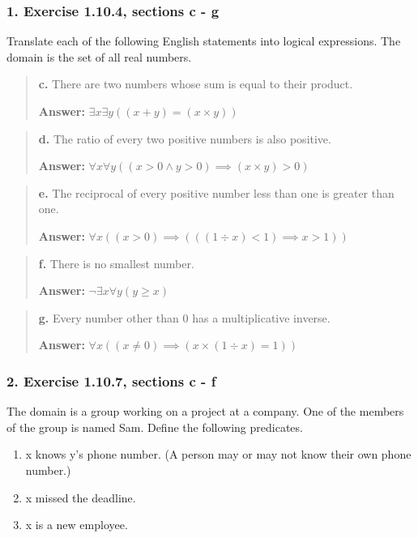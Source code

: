 \documentclass[11pt, oneside]{article}
\begin{document}
\subsubsection*{1. Exercise 1.10.4, sections c - g}

Translate each of the following English statements into logical expressions. The domain is the set of all real numbers.

\begin{quote}
    \textbf{c. }There are two numbers whose sum is equal to their product.

    \textbf{Answer:} $\exists x \exists y ((x + y) = (x \times y))$
\end{quote}

\begin{quote}
    \textbf{d. }The ratio of every two positive numbers is also positive.

    \textbf{Answer:} $\forall x \forall y ((x > 0 \land y > 0) \implies (x \times y) > 0)$
\end{quote}

\begin{quote}
    \textbf{e. }The reciprocal of every positive number less than one is greater than one.

    \textbf{Answer:} $\forall x ((x > 0) \implies (((1 \div x) < 1) \implies x > 1))$
\end{quote}

\begin{quote}
    \textbf{f. }There is no smallest number.

    \textbf{Answer:} $\neg \exists x \forall y (y \geqslant x)$
\end{quote}

\begin{quote}
    \textbf{g. }Every number other than 0 has a multiplicative inverse.

    \textbf{Answer:} $\forall x ((x \ne 0) \implies (x \times (1 \div x) = 1))$
\end{quote}

\subsubsection*{2. Exercise 1.10.7, sections c - f}

The domain is a group working on a project at a company. One of the members of the group is named Sam. Define the following predicates.

\begin{enumerate}
    \item[P(x, y):] x knows y's phone number. (A person may or may not know their own phone number.)
    \item[D(x):] x missed the deadline.
    \item[N(x):] x is a new employee.
\end{enumerate}
\end{document}
